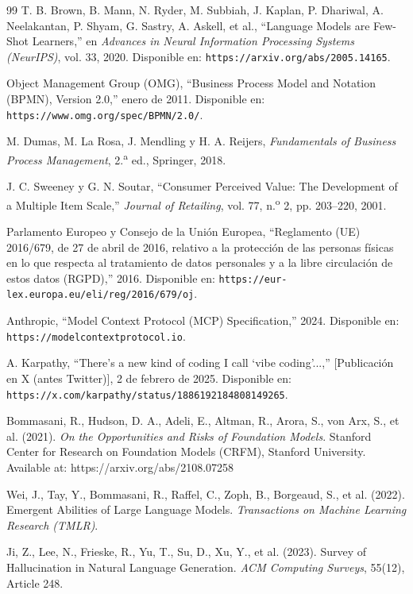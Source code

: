 \begin{thebibliography}{99}
T. B. Brown, B. Mann, N. Ryder, M. Subbiah, J. Kaplan, P. Dhariwal, A. Neelakantan, P. Shyam, G. Sastry, A. Askell, et al., ``Language Models are Few-Shot Learners,'' en \textit{Advances in Neural Information Processing Systems (NeurIPS)}, vol. 33, 2020. Disponible en: \texttt{https://arxiv.org/abs/2005.14165}.

Object Management Group (OMG), ``Business Process Model and Notation (BPMN), Version 2.0,'' enero de 2011. Disponible en: \texttt{https://www.omg.org/spec/BPMN/2.0/}.

M. Dumas, M. La Rosa, J. Mendling y H. A. Reijers, \textit{Fundamentals of Business Process Management}, 2.\textsuperscript{a} ed., Springer, 2018.

J. C. Sweeney y G. N. Soutar, ``Consumer Perceived Value: The Development of a Multiple Item Scale,'' \textit{Journal of Retailing}, vol. 77, n.\textsuperscript{o} 2, pp. 203--220, 2001.

Parlamento Europeo y Consejo de la Unión Europea, ``Reglamento (UE) 2016/679, de 27 de abril de 2016, relativo a la protección de las personas físicas en lo que respecta al tratamiento de datos personales y a la libre circulación de estos datos (RGPD),'' 2016. Disponible en: \texttt{https://eur-lex.europa.eu/eli/reg/2016/679/oj}.

Anthropic, ``Model Context Protocol (MCP) Specification,'' 2024. Disponible en: \texttt{https://modelcontextprotocol.io}.

A. Karpathy, ``There's a new kind of coding I call `vibe coding'...,'' [Publicación en X (antes Twitter)], 2 de febrero de 2025. Disponible en: \texttt{https://x.com/karpathy/status/1886192184808149265}.

Bommasani, R., Hudson, D. A., Adeli, E., Altman, R., Arora, S., von Arx, S., et al. (2021).
\textit{On the Opportunities and Risks of Foundation Models}.
Stanford Center for Research on Foundation Models (CRFM), Stanford University.
Available at: https://arxiv.org/abs/2108.07258

Wei, J., Tay, Y., Bommasani, R., Raffel, C., Zoph, B., Borgeaud, S., et al. (2022).
Emergent Abilities of Large Language Models.
\textit{Transactions on Machine Learning Research (TMLR)}.

Ji, Z., Lee, N., Frieske, R., Yu, T., Su, D., Xu, Y., et al. (2023).
Survey of Hallucination in Natural Language Generation.
\textit{ACM Computing Surveys}, 55(12), Article 248.


\end{thebibliography}
